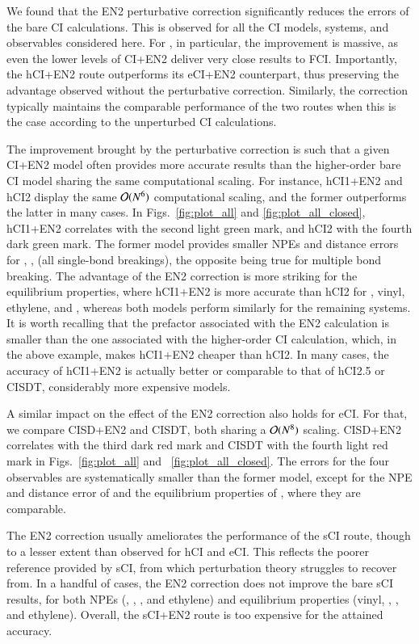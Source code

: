 \documentclass[aip,jcp,reprint,noshowkeys,superscriptaddress]{revtex4-1}
\begin{document}
We found that the EN2 perturbative correction significantly reduces the errors of the bare CI calculations.
This is observed for all the CI models, systems, and observables considered here.
For , in particular, the improvement is massive, as even the lower levels of CI+EN2 deliver very close results to FCI.
Importantly, the hCI+EN2 route outperforms its eCI+EN2 counterpart, thus preserving the advantage observed without the perturbative correction.
Similarly, the correction typically maintains the comparable performance of the two routes when this is the case according to the unperturbed CI calculations.

The improvement brought by the perturbative correction is such that a given CI+EN2 model often provides more accurate results than the higher-order bare CI model sharing the same computational scaling.
For instance, hCI1+EN2 and hCI2 display the same $\order*{N^6}$ computational scaling, and the former outperforms the latter in many cases.
In Figs.~\ref{fig:plot_all} and \ref{fig:plot_all_closed}, hCI1+EN2 correlates with the second light green mark, and hCI2 with the fourth dark green mark.
The former model provides smaller NPEs and distance errors for , ,  (all single-bond breakings),
the opposite being true for multiple bond breaking.
The advantage of the EN2 correction is more striking for the equilibrium properties,
where hCI1+EN2 is more accurate than hCI2 for , vinyl, ethylene, and ,
whereas both models perform similarly for the remaining systems.
It is worth recalling that the prefactor associated with the EN2 calculation is smaller than the one associated with the higher-order CI calculation,
which, in the above example, makes hCI1+EN2 cheaper than hCI2.
In many cases, the accuracy of hCI1+EN2 is actually better or comparable to that of hCI2.5 or CISDT, considerably more expensive models.

A similar impact on the effect of the EN2 correction also holds for eCI.
For that, we compare CISD+EN2 and CISDT, both sharing a $\order*{N^8}$ scaling.
CISD+EN2 correlates with the third dark red mark and CISDT with the fourth light red mark in Figs.~\ref{fig:plot_all} and ~\ref{fig:plot_all_closed}.
The errors for the four observables are systematically smaller than the former model,
except for the NPE and distance error of  and the equilibrium properties of , where they are comparable.

The EN2 correction usually ameliorates the performance of the sCI route, though to a lesser extent than observed for hCI and eCI.
This reflects the poorer reference provided by sCI, from which perturbation theory struggles to recover from.
In a handful of cases, the EN2 correction does not improve the bare sCI results,
for both NPEs (, , , and ethylene)
and equilibrium properties (vinyl, , , and ethylene).
Overall, the sCI+EN2 route is too expensive for the attained accuracy.
\end{document}
